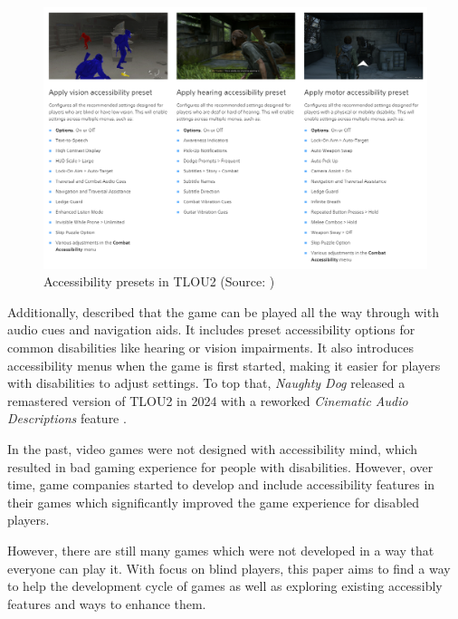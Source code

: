 \documentclass[sigconf,natbib=false,10pt]{acmart}
\begin{document}
	\begin{figure}[ht]
		\centering
		\includegraphics[scale=0.6,width=\textwidth]{assets/tlou-accessibility-presets.png}
		\caption{Accessibility presets in TLOU2 (Source: \textcite{playstation_last_2020-1})}
		\label{fig:tlou-accessibility-presets}
	\end{figure}

	Additionally, \textcite{dale_last_2024} described that the game can be played all the way through with audio cues and navigation aids.
	It includes preset accessibility options for common disabilities like hearing or vision impairments. 
	It also introduces accessibility menus when the game is first started, making it easier for players with disabilities to adjust settings.
	To top that, \emph{Naughty Dog} released a remastered version of TLOU2 in 2024 with a reworked \emph{Cinematic Audio Descriptions} feature \cite{playstation_last_2024}.
	
	In the past, video games were not designed with accessibility mind, which resulted in bad gaming experience for people with disabilities. 
	However, over time, game companies started to develop and include accessibility features in their games which significantly improved the game experience for disabled players.
	
	However, there are still many games which were not developed in a way that everyone can play it.
	With focus on blind players, this paper aims to find a way to help the development cycle of games as well as exploring existing accessibly features and ways to enhance them.
	
\end{document}
